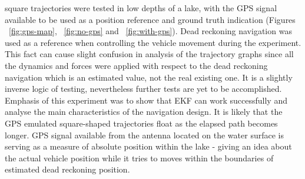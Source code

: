 \begin{figure}%
  \centering
\end{figure}

 square trajectories were tested in low depths of a lake, with the GPS signal available to be used as a position reference and ground truth indication (Figures ~\ref{fig:gps-map}, ~\ref{fig:no-gps} and ~\ref{fig:with-gps}). Dead reckoning navigation was used as a reference when controlling the vehicle movement during the experiment. This fact can cause slight confusion in analysis of the trajectory graphs since all the dynamics and forces were applied with respect to the dead reckoning navigation which is an estimated value, not the real existing one. It is a slightly inverse logic of testing, nevertheless further tests are yet to be accomplished. Emphasis of this experiment was to show that EKF can work successfully and analyse the main characteristics of the navigation design. It is likely that the GPS emulated square-shaped trajectories float as the elapsed path becomes longer. GPS signal available from the antenna located on the water surface is serving as a measure of absolute position within the lake - giving an idea about the actual vehicle position while it tries to moves within the boundaries of estimated dead reckoning position. 

